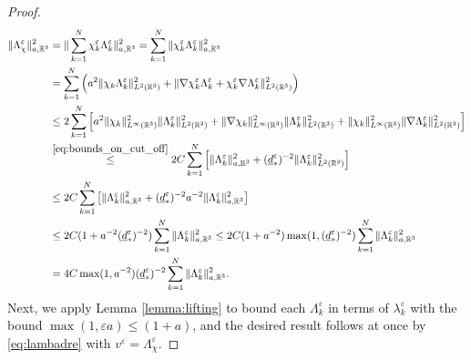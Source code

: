 \documentclass[10pt,a4paper]{amsart}
\newcommand{\re}{\varepsilon}
\begin{document}
\begin{proof}
			\begin{align*}%
				\| \Lambda^{\re}_{\chi} \|^2_{a, \mathbb{R}^3} &=  \|  \sum_{k=1}^N \chi_k^{\re} \Lambda^{\re}_k \|^2_{a,\mathbb{R}^3} = \sum_{k=1}^N \|  \chi_k^{\re} \Lambda^{\re}_k \|^2_{a,\mathbb{R}^3}\\ 
				&=\sum_{k=1}^N \left( a^2 \|  \chi_k \Lambda^{\re}_k \|^2_{L^2(\mathbb{R}^3)}+\|  \nabla\chi_k^{\re} \Lambda^{\re}_k+\chi_k^{\re}\nabla \Lambda^{\re}_k \|^2_{L^2(\mathbb{R}^3)}\right)\\
				&\leq 2\sum_{k=1}^{N}  \left[a^2 \| \chi_k \|^2_{L^{\infty}(\mathbb{R}^3)} \| \Lambda^{\re}_k \|^2_{L^2(\mathbb{R}^3)}  + \| \nabla \chi_k \|^2_{L^{\infty}(\mathbb{R}^3)} \| \Lambda^{\re}_k \|^2_{L^2(\mathbb{R}^3)} + \| \chi_k \|^2_{L^{\infty}(\mathbb{R}^3)} \|\nabla \Lambda^{\re}_k \|^2_{L^2(\mathbb{R}^3)} \right]\\
				&\overset{	\eqref{eq:bounds_on_cut_off}}{\leq }2C\sum_{k=1}^{N} \left[\| \Lambda^{\re}_k \|^2_{a, \mathbb{R}^3} + (\underline{d}^{\re}_*)^{-2} \| \Lambda^{\re}_k \|^2_{L^2(\mathbb{R}^3)}\right] \\
				&\leq 2C \sum_{k=1}^{N} \left[\| \Lambda^{\re}_k \|^2_{a, \mathbb{R}^3} + ( \underline{d}^{\re}_*)^{-2} a^{-2} \| \Lambda^{\re}_k \|^2_{a, \mathbb{R}^3}\right] \\
				&\leq 2C(1+ a^{-2}(\underline{d}^{\re}_*)^{-2}) \sum_{k=1}^{N} \| \Lambda^{\re}_k \|^2_{a, \mathbb{R}^3}\leq 2C(1+ a^{-2})\max(1, (\underline{d}^{\re}_*)^{-2})\sum_{k=1}^{N} \| \Lambda^{\re}_k \|^2_{a, \mathbb{R}^3}\\
				&= 4C\max(1,a^{-2}) (\underline{d}^{\re}_*)^{-2}\sum_{k=1}^{N} \| \Lambda^{\re}_k \|^2_{a, \mathbb{R}^3}.
			\end{align*}
			Next, we apply Lemma \ref{lemma:lifting} to bound each $\Lambda_k^{\re}$ in terms of $\lambda^{\re}_k$ with the bound $\max(1, \re a) \leq (1+a)$, and the desired result follows at once by \eqref{eq:lambadre} with $v^{\re}=\Lambda^{\re}_{\chi}$.
		\end{proof}
\end{document}
